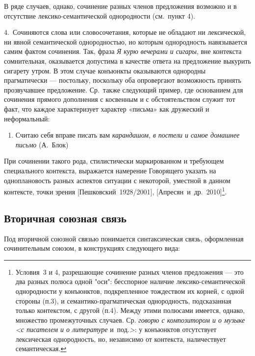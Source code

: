 В ряде случаев, однако, сочинение разных членов предложения возможно и в
отсутствие лексико-семантической однородности (см.~пункт 4).

4.~Сочиняются слова или словосочетания, которые не обладают ни
лексической, ни явной семантической однородностью, но которым
однородность навязывается самим фактом сочинения. Так, фраза \textit{Я
  курю вечерами и сигары}, вне контекста сомнительная, оказывается
допустима в качестве ответа на предложение выкурить сигарету утром. В
этом случае конъюнкты оказываются однородны прагматически --- постольку,
поскольку оба опровергают возможность принять прозвучавшее предложение.
Ср.~также следующий пример, где основанием для сочинения прямого
дополнения с косвенным и с обстоятельством служит тот факт, что каждое
характеризует характер «письма» как дружеский и неформальный:

\begin{enumerate}
  \def\labelenumi{(\arabic{enumi})}
  \setcounter{enumi}{42}
  \item
        Считаю себя вправе писать вам \textit{карандашом}, \textit{в постели и
          самое домашнее письмо} (А.~Блок)
\end{enumerate}

При сочинении такого рода, стилистически маркированном и требующем
специального контекста, выражается намерение Говорящего указать на
одноплановость разных аспектов ситуации с некоторой, уместной в данном
контексте, точки зрения {[}Пешковский~1928/2001{]},
{[}Апресян~и~др.~2010{]}\footnote{Условия~3 и 4, разрешающие сочинение
  разных членов предложения --- это два разных полюса одной "оси":
  бесспорное наличие лексико-семантической однородности у конъюнктов,
  подкрепленное тождеством их корней, с одной стороны (п.3), и
  семантико-прагматическая однородность, подсказанная только контекстом,
  с другой (п.4). Между этими полюсами имеется, однако, множество
  промежуточных случаев. Ср. \textit{говорю с композитором и о музыке
    \textless с писателем и о литературе} и~под.\textit{\textgreater{}}: у
  конъюнктов отсутствует лексическая однородность, но, независимо от
  контекста, наличествует семантическая.}.

\subsection{Вторичная союзная
  связь}\label{ux432ux442ux43eux440ux438ux447ux43dux430ux44f-ux441ux43eux44eux437ux43dux430ux44f-ux441ux432ux44fux437ux44c}

Под вторичной союзной связью понимается синтаксическая связь,
оформленная сочинительным союзом, в конструкциях следующего вида:

